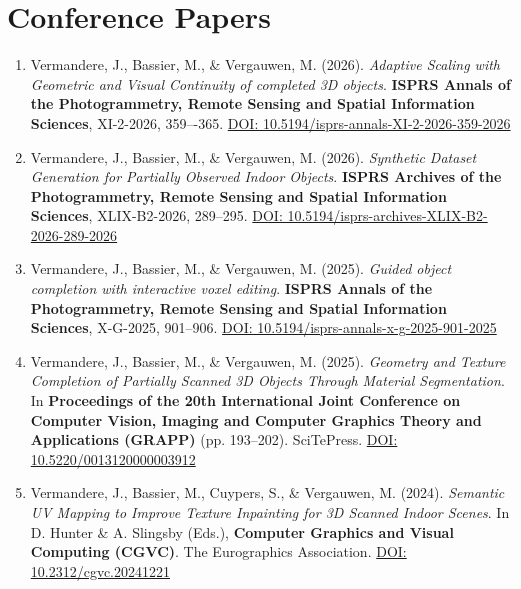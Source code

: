 \section*{Conference Papers}
\begin{enumerate}

    \item Vermandere, J., Bassier, M., \& Vergauwen, M. (2026). \textit{Adaptive Scaling with Geometric and Visual Continuity of completed 3D objects}. \textbf{ISPRS Annals of the Photogrammetry, Remote Sensing and Spatial Information Sciences}, XI-2-2026, 359–-365. \href{https://doi.org/10.5194/isprs-annals-XI-2-2026-359-2026}{DOI: 10.5194/isprs-annals-XI-2-2026-359-2026}
    
    \item Vermandere, J., Bassier, M., \& Vergauwen, M. (2026). \textit{Synthetic Dataset Generation for Partially Observed Indoor Objects}. \textbf{ISPRS Archives of the Photogrammetry, Remote Sensing and Spatial Information Sciences}, XLIX-B2-2026, 289–295. \href{https://doi.org/10.5194/isprs-archives-XLIX-B2-2026-289-2026}{DOI: 10.5194/isprs-archives-XLIX-B2-2026-289-2026}
    
    \item Vermandere, J., Bassier, M., \& Vergauwen, M. (2025). \textit{Guided object completion with interactive voxel editing}. \textbf{ISPRS Annals of the Photogrammetry, Remote Sensing and Spatial Information Sciences}, X-G-2025, 901--906. \href{https://doi.org/10.5194/isprs-annals-x-g-2025-901-2025}{DOI: 10.5194/isprs-annals-x-g-2025-901-2025}

    \item Vermandere, J., Bassier, M., \& Vergauwen, M. (2025). \textit{Geometry and Texture Completion of Partially Scanned 3D Objects Through Material Segmentation}. In \textbf{Proceedings of the 20th International Joint Conference on Computer Vision, Imaging and Computer Graphics Theory and Applications (GRAPP)} (pp. 193--202). SciTePress. \href{https://doi.org/10.5220/0013120000003912}{DOI: 10.5220/0013120000003912}
    
    \item Vermandere, J., Bassier, M., Cuypers, S., \& Vergauwen, M. (2024). \textit{Semantic UV Mapping to Improve Texture Inpainting for 3D Scanned Indoor Scenes}. In D. Hunter \& A. Slingsby (Eds.), \textbf{Computer Graphics and Visual Computing (CGVC)}. The Eurographics Association. \href{https://doi.org/10.2312/cgvc.20241221}{DOI: 10.2312/cgvc.20241221}
    

\end{enumerate}
